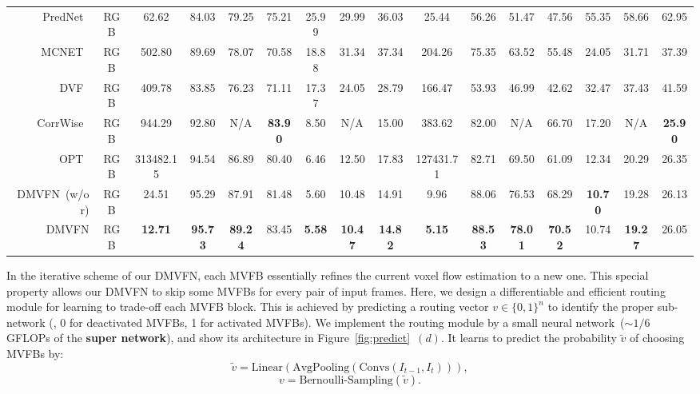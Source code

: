\documentclass[10pt,twocolumn,letterpaper]{article}
\begin{document}
\begin{table*}[th]
{\begin{tabular}{rccccccccccccccc}
PredNet~\cite{prednet} & RGB & 62.62 & 84.03 & 79.25& 75.21 & 25.99 & 29.99& 36.03 & 25.44 & 56.26 &  51.47& 47.56 & 55.35 & 58.66& 62.95               \\
MCNET~\cite{mcnet} & RGB & 502.80 & 89.69 & 78.07& 70.58 & 18.88 & 31.34& 37.34 & 204.26 & 75.35  & 63.52& 55.48 & 24.05  & 31.71& 37.39  \\
DVF~\cite{dvf} & RGB & 409.78 & 83.85 & 76.23& 71.11 & 17.37 & 24.05& 28.79& 166.47 & 53.93 & 46.99& 42.62  & 32.47  & 37.43& 41.59         \\
CorrWise~\cite{corrwise} & RGB & 944.29 & 92.80 & N/A & \textbf{83.90} & 8.50 & N/A & 15.00 & 383.62 & 82.00 & N/A & 66.70 & 17.20 & N/A & \textbf{25.90}\\ 
OPT~\cite{wu2022optimizing} & RGB &  313482.15  & 94.54 & 86.89 & 80.40 & 6.46 & 12.50&17.83 & 127431.71 & 82.71 & 69.50 & 61.09 & 12.34 & 20.29 & 26.35\\

DMVFN~(w/o r)  & RGB &  24.51  & 95.29 & 87.91 & 81.48 & 5.60 & 10.48 & 14.91 & 9.96 &88.06 & 76.53 & 68.29 & \textbf{10.70} & 19.28 & 26.13 \\
DMVFN  & RGB & \textbf{12.71} & \textbf{95.73} & \textbf{89.24}& 83.45 & \textbf{5.58} & \textbf{10.47}& \textbf{14.82} & \textbf{5.15} & \textbf{88.53} & \textbf{78.01} & \textbf{70.52} & 10.74 & \textbf{19.27} & 26.05    \\

\midrule
\end{tabular}
}
\end{table*}

In the iterative scheme of our DMVFN, each MVFB essentially refines the current voxel flow estimation to a new one. This special property allows our DMVFN to skip some MVFBs for every pair of input frames. Here, we design a differentiable and efficient routing module for learning to trade-off each MVFB block. This is achieved by predicting a routing vector $v\in\{0,1\}^{n}$ to identify the proper sub-network (\eg, 0 for deactivated MVFBs, 1 for activated MVFBs). We implement the routing module by a small neural network~($\sim1/6$ GFLOPs of the \textbf{super network}), and show its architecture in Figure~\ref{fig:predict}~$(d)$. It learns to predict the probability $\tilde{v}$ of choosing MVFBs by:
\begin{equation}
\tilde{v} = \text{Linear}(\text{AvgPooling}(\text{Convs}(I_{t-1},I_t))), 
\end{equation}
\begin{equation}
v = \text{Bernoulli-Sampling}(\tilde{v}). 
\end{equation}
\end{document}
